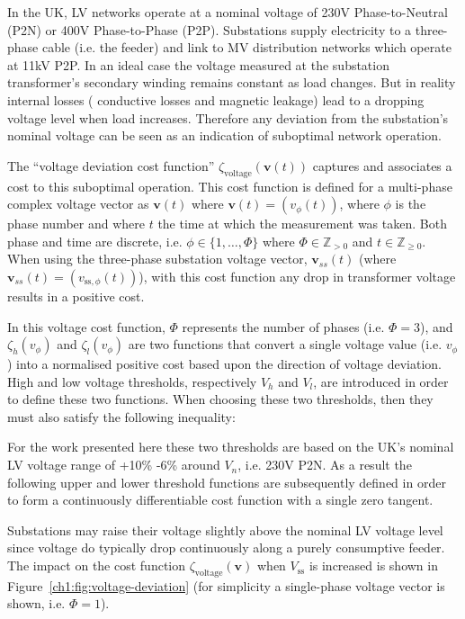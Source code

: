 In the UK, LV networks operate at a nominal voltage of 230V Phase-to-Neutral (P2N) or 400V Phase-to-Phase (P2P).
Substations supply electricity to a three-phase cable (i.e. the feeder) and link to MV distribution networks which operate at 11kV P2P.
In an ideal case the voltage measured at the substation transformer's secondary winding remains constant as load changes.
But in reality internal losses ( conductive losses and magnetic leakage) lead to a dropping voltage level when load increases.
Therefore any deviation from the substation's nominal voltage can be seen as an indication of suboptimal network operation.

The ``voltage deviation cost function'' $\zeta_\text{voltage}(\textbf{v}(t))$ captures and associates a cost to this suboptimal operation.
This cost function is defined for a multi-phase complex voltage vector as $\textbf{v}(t)$ where $\textbf{v}(t) = (v_\phi(t))$, where $\phi$ is the phase number and where $t$ the time at which the measurement was taken.
Both phase and time are discrete, i.e. $\phi \in \{1,\dots,\Phi\}$ where $\Phi \in \mathbb{Z}_{>0}$ and $t \in \mathbb{Z}_{\geq0}$.
When using the three-phase substation voltage vector, $\textbf{v}_{ss}(t)$ (where $\textbf{v}_{ss}(t) = (v_{\text{ss},\phi}(t))$), with this cost function any drop in transformer voltage results in a positive cost.



In this voltage cost function, $\Phi$ represents the number of phases (i.e. $\Phi = 3$), and $\zeta_h(v_\phi)$ and $\zeta_l(v_\phi)$ are two functions that convert a single voltage value (i.e. $v_\phi$) into a normalised positive cost based upon the direction of voltage deviation.
High and low voltage thresholds, respectively $V_h$ and $V_l$, are introduced in order to define these two functions.
When choosing these two thresholds, then they must also satisfy the following inequality:



For the work presented here these two thresholds are based on the UK's nominal LV voltage range of +10\% -6\% around $V_n$, i.e. 230V P2N.
As a result the following upper and lower threshold functions are subsequently defined in order to form a continuously differentiable cost function with a single zero tangent.



Substations may raise their voltage slightly above the nominal LV voltage level since voltage do typically drop continuously along a purely consumptive feeder.
The impact on the cost function $\zeta_\text{voltage}(\textbf{v})$ when $V_\text{ss}$ is increased is shown in Figure~\ref{ch1:fig:voltage-deviation} (for simplicity a single-phase voltage vector is shown, i.e. $\Phi = 1$).

